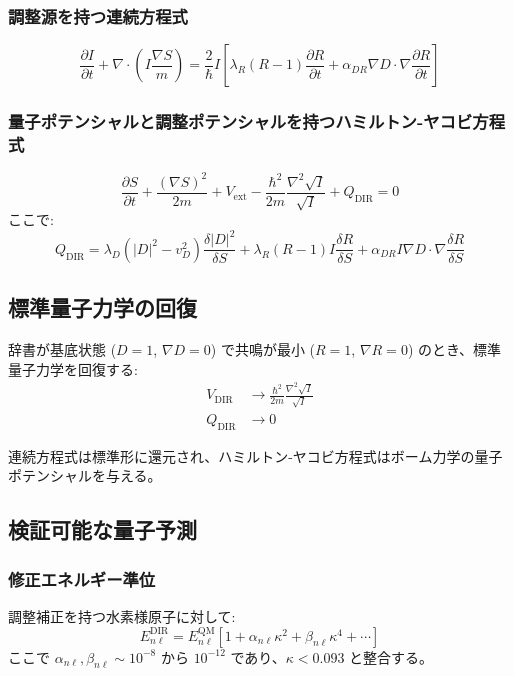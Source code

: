 \documentclass[11pt,a4paper]{article}
\begin{document}
	\subsubsection{調整源を持つ連続方程式}
	\begin{equation}
		\frac{\partial I}{\partial t} + \nabla \cdot \left( I \frac{\nabla S}{m} \right) = \frac{2}{\hbar} I \left[ \lambda_R (R-1) \frac{\partial R}{\partial t} + \alpha_{DR} \nabla D \cdot \nabla \frac{\partial R}{\partial t} \right]
	\end{equation}
	
	\subsubsection{量子ポテンシャルと調整ポテンシャルを持つハミルトン-ヤコビ方程式}
	\begin{equation}
		\frac{\partial S}{\partial t} + \frac{(\nabla S)^2}{2m} + V_{\text{ext}} - \frac{\hbar^2}{2m} \frac{\nabla^2 \sqrt{I}}{\sqrt{I}} + Q_{\text{DIR}} = 0
	\end{equation}
	ここで:
	\begin{equation}
		Q_{\text{DIR}} = \lambda_D (|D|^2 - v_D^2) \frac{\delta |D|^2}{\delta S} 
		+ \lambda_R (R-1) I \frac{\delta R}{\delta S}
		+ \alpha_{DR} I \nabla D \cdot \nabla \frac{\delta R}{\delta S}
	\end{equation}
	
	\subsection{標準量子力学の回復}
	
	辞書が基底状態 ($D = 1$, $\nabla D = 0$) で共鳴が最小 ($R = 1$, $\nabla R = 0$) のとき、標準量子力学を回復する:
	\begin{align}
		V_{\text{DIR}} &\to \frac{\hbar^2}{2m} \frac{\nabla^2 \sqrt{I}}{\sqrt{I}} \\
		Q_{\text{DIR}} &\to 0
	\end{align}
	
	連続方程式は標準形に還元され、ハミルトン-ヤコビ方程式はボーム力学の量子ポテンシャルを与える。
	
	\subsection{検証可能な量子予測}
	
	\subsubsection{修正エネルギー準位}
	調整補正を持つ水素様原子に対して:
	\begin{equation}
		E_{n\ell}^{\text{DIR}} = E_{n\ell}^{\text{QM}} \left[ 1 + \alpha_{n\ell} \kappa^2 + \beta_{n\ell} \kappa^4 + \cdots \right]
	\end{equation}
	ここで $\alpha_{n\ell}, \beta_{n\ell} \sim 10^{-8}$ から $10^{-12}$ であり、$\kappa < 0.093$ と整合する。
	
\end{document}
